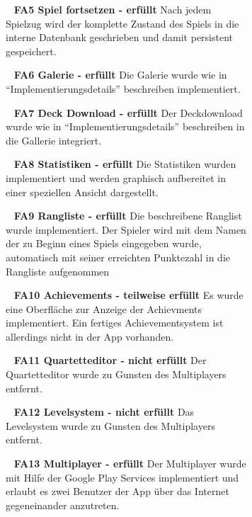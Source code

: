 \documentclass{scrartcl}
\begin{document}
\begin{figure}[!ht]
\begin{figure}[!ht]
\ \newline
\textbf{FA5 Spiel fortsetzen - erfüllt} \newline
Nach jedem Spielzug wird der komplette Zustand des Spiels in die interne
Datenbank geschrieben und damit persistent gespeichert.

\ \newline
\textbf{FA6 Galerie - erfüllt} \newline
Die Galerie wurde wie in \enquote{Implementierungsdetails} beschreiben
implementiert.

\ \newline
\textbf{FA7 Deck Download - erfüllt} \newline
Der Deckdownload wurde wie in \enquote{Implementierungsdetails} beschreiben in
die Gallerie integriert.

\ \newline
\textbf{FA8 Statistiken - erfüllt} \newline
Die Statistiken wurden implementiert und werden graphisch aufbereitet in einer
speziellen Ansicht dargestellt.

\ \newline
\textbf{FA9 Rangliste - erfüllt} \newline
Die beschreibene Ranglist wurde implementiert. Der Spieler wird mit dem Namen
der zu Beginn eines Spiels eingegeben wurde, automatisch mit seiner erreichten
Punktezahl in die Rangliste aufgenommen

\ \newline
\textbf{FA10 Achievements - teilweise erfüllt} \newline
Es wurde eine Oberfläche zur Anzeige der Achievments implementiert. Ein fertiges
Achievementsystem ist allerdings nicht in der App vorhanden.

\ \newline
\textbf{FA11 Quartetteditor - nicht erfüllt} \newline
Der Quartetteditor wurde zu Gunsten des Multiplayers entfernt.

\ \newline
\textbf{FA12 Levelsystem - nicht erfüllt} \newline
Das Levelsystem wurde zu Gunsten des Multiplayers entfernt.

\ \newline
\textbf{FA13 Multiplayer - erfüllt} \newline
Der Multiplayer wurde mit Hilfe der Google Play Services implementiert und
erlaubt es zwei Benutzer der App über das Internet gegeneinander anzutreten.


\end{figure}
\end{figure}
\end{document}
